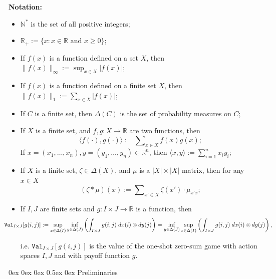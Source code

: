 \documentclass[english,openary,12pt]{article}
\makeatletter
\renewcommand\section{\@startsection {section}{1}{\z@}%
                                   {0ex \@plus 0ex \@minus 0ex}%
                                   {0.5ex \@plus0ex}%
                                   {\normalfont\LARGE\bfseries}}%
\newcommand{\red}[1]{\textcolor{black}{#1}}
\newcommand{\brown}[1]{\textcolor{black}{#1}}
\theoremstyle{definition}
\newcommand{\R}{\mathbb{R}}
\newcommand{\N}{\mathbb{N}}
\makeatother
\begin{document}
\textbf{Notation:}
\vspace{-0.15cm}
\begin{itemize}
	\item $\N^*$ is the set of all positive integers;
	\item $\R_+ := \{x : x \in \R \text{ and } x \ge 0\}$;
	\item If $f(x)$ is a function defined on a set $X$, then 
	$\|f(x)\|_\infty := \sup_{x \in X}|f(x)|$;
	\item If $f(x)$ is a function defined on a finite set $X$, then 
	$\|f(x)\|_1 := \sum_{x \in X}|f(x)|$;
	\item If $C$ is a finite set, then 
	$\Delta (C)$ is the set of probability measures on $C$;
	\item If $X$ is a finite set, and $f,g : X \to \R$ are two functions, then
	$$\langle f (\cdot), g (\cdot)\rangle := \sum\nolimits_{x\in X} f(x) g(x);$$
  If $x = (x_1, \ldots, x_n), y = (y_1, \ldots, y_n) \in \R^n$, then 
  $\langle x, y \rangle := \sum_{i=1}^n x_i y_i$;
	\item If $X$ is a finite set, $\zeta \in \Delta(X)$, and 
	$\mu$ is a $|X| \times |X|$ matrix, then for any $x\in X$
	$$\left(\zeta * \mu\right)(x) := 
	\sum\nolimits_{x'\in X} \zeta(x') \cdot \mu_{x'x};$$
	\item If $I, J$ are \red{finite} sets and $g : I \times J \to \R$ is a function, then 
	\begin{multline*}\hspace{-1cm}
  \texttt{Val}_{I \times J} [g(i,j)] := 
	\sup_{x \in \Delta(I)} \inf_{y \in \Delta(J)} 
	\left(\int_{I \times J} g (i, j) \; dx (i) \otimes dy (j)\right) =
	\inf_{y \in \Delta(J)} \sup_{x \in \Delta(I)} 
	\left(\int_{I \times J} g (i, j) \; dx (i) \otimes dy (j)\right),
  \end{multline*}

	i.e. $\texttt{Val}_{I \times J} [g(i,j)]$ is the value of \brown{the} one-shot zero-sum game with action spaces $I, J$ and with payoff function $g$.
\end{itemize}


 
\iffalse
\section{Preliminaries}
\end{document}
